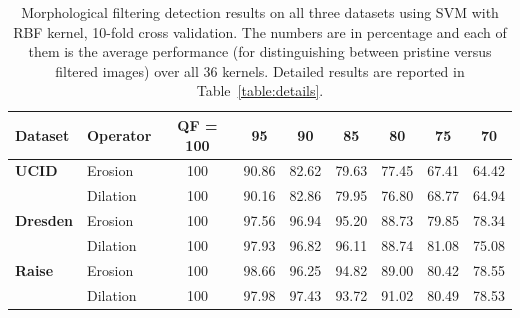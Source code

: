 \documentclass{ieeeaccess}
\begin{document}
\begin{table}[t!]
	\centering
	\caption{Morphological filtering detection results on all three datasets  using SVM with RBF kernel, 10-fold cross validation. The numbers are in percentage and each of them is the average performance (for distinguishing between pristine versus filtered images) over all 36 kernels. Detailed results are reported in Table~\ref{table:details}.}
	\label{table:detection_results}
	\begin{tabular}{l|l|ccccccc}
		\hline\hline
		\textbf{Dataset} & \textbf{Operator} & \textbf{QF = 100} & \textbf{95} & \textbf{90} & \textbf{85} & \textbf{80} & \textbf{75} & \textbf{70} \\
		\hline
		\textbf{UCID} & Erosion & 100 & 90.86 & 82.62 & 79.63 & 77.45 & 67.41 & 64.42 \\
		& Dilation & 100 & 90.16 & 82.86 & 79.95 & 76.80 & 68.77 & 64.94 \\
		\hline
		\textbf{Dresden} & Erosion & 100 & 97.56 & 96.94 & 95.20 & 88.73 & 79.85 & 78.34 \\
		& Dilation & 100 & 97.93 & 96.82 & 96.11 & 88.74 & 81.08 & 75.08 \\
		\hline
		\textbf{Raise} & Erosion & 100 & 98.66 & 96.25 & 94.82 & 89.00 & 80.42 & 78.55 \\
		& Dilation & 100 & 97.98 & 97.43 & 93.72 & 91.02 & 80.49 & 78.53 \\
		\hline\hline
	\end{tabular}%
\end{table}
\end{document}
